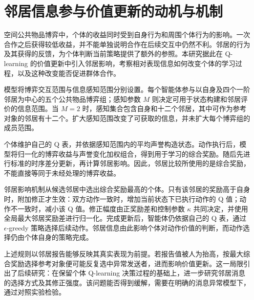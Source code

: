 \section{邻居信息参与价值更新的动机与机制}

空间公共物品博弈中，个体的收益同时受到自身行为和周围个体行为的影响。一次合作之后获得较低收益，并不能单独说明合作在后续交互中仍然不利。邻居的行为及其获得的反馈，为个体判断当前策略提供了额外的参照。本研究据此在 Q-learning 的价值更新中引入邻居影响，考察相对表现信息如何改变个体的学习过程，以及这种改变能否促进群体合作。

模型将博弈交互范围与信息感知范围分别设置。每个智能体参与以自身及四个一阶邻居为中心的五个公共物品博弈组；感知参数 $M$ 则决定可用于状态构建和邻居评价的信息范围。当 $M=2$ 时，感知集合包含自身和十二个邻居，其中可作为参考对象的邻居有十二个。扩大感知范围改变了可获取的信息，并未扩大每个博弈组的成员范围。

个体维护自己的 Q 表，并依据感知范围内的平均声誉构造状态。动作执行后，模型将归一化的博弈收益与声誉变化加权组合，得到用于学习的综合奖励。随后先进行标准的时序差分更新，再计算邻居影响。因此，邻居比较所使用的是综合奖励，不能直接等同于未经处理的博弈收益。

邻居影响机制从候选邻居中选出综合奖励最高的个体。只有该邻居的奖励高于自身时，附加修正才生效：双方动作一致时，增加当前状态下已执行动作的 Q 值；动作不一致时，减小该 Q 值。修正幅度由正奖励差和控制参数 $\kappa$ 共同决定，并使用全局最大邻居奖励差进行归一化。完成更新后，智能体仍依据自己的 Q 表，通过 $\epsilon$-greedy 策略选择后续动作。邻居信息由此影响个体对动作价值的判断，而动作选择仍由个体自身的策略完成。

上述规则以邻居报告能够反映其真实表现为前提。若报告值被人为抬高，按最大综合奖励选择参考对象便可能反复选中异常发送者，进而影响价值更新。这一局限引出了后续研究：在保留个体 Q-learning 决策过程的基础上，进一步研究邻居消息的选择方式及其修正强度。该问题能否得到缓解，需要在明确的消息异常模型下，通过对照实验检验。
